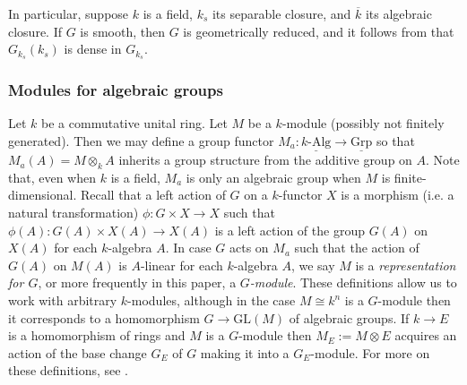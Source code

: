 \documentclass[11pt,reqno]{amsart}
\theoremstyle{definition}
\theoremstyle{remark}
\theoremstyle{definition}
\theoremstyle{plain}
\newcommand{\GL}{\mathrm{GL}}
\newcommand{\bark}{{\overline{k}}}
\begin{document}
\begin{center}\end{center}

In particular, suppose $k$ is a field, $k_s$ its separable closure, and $\bark$ its algebraic closure.
If $G$ is smooth, then $G$ is geometrically reduced, and it follows from \cite[Cor. 1.17]{Milne17}
that $G_{k_s}(k_s)$ is dense in $G_{k_s}$.

\subsubsection{Modules for algebraic groups}\label{sec:Gmods} 
Let $k$ be a commutative unital ring.
Let $M$ be a $k$-module (possibly not finitely generated). 
Then we may define a group functor $M_a:\underline{k\textrm{-Alg}}\to \underline{\mathrm{Grp}}$ so that 
$M_a(A)=M\otimes_k A$ inherits a group structure from the additive group on $A$. 
Note that, even when $k$ is a field, $M_a$ is only an algebraic group when $M$ is finite-dimensional. 
Recall that a left action of $G$ on a $k$-functor $X$ is a morphism (i.e. a natural transformation) 
$\phi:G\times X\to X$ such that $\phi(A):G(A)\times X(A)\to X(A)$ is a left action of the group $G(A)$ on $X(A)$ for each $k$-algebra $A$. 
In case $G$ acts on $M_a$ such that the action of $G(A)$ on $M(A)$ is $A$-linear for each $k$-algebra $A$, we say $M$ is a \emph{representation for $G$}, or more frequently in this paper, a \emph{$G$-module}. 
These definitions allow us to work with arbitrary $k$-modules, 
although in the case $M\cong k^n$ is a $G$-module 
then it corresponds to a homomorphism $G\to \GL(M)$ of algebraic groups. 
If $k\to E$ is a homomorphism of rings and $M$ is a $G$-module then $M_{E}:=M\otimes E$ acquires an action of the base change $G_{E}$ of $G$ making it into a 
$G_{E}$-module.
For more on these definitions, see \cite[\S I.2]{Jan03}.
\end{document}
